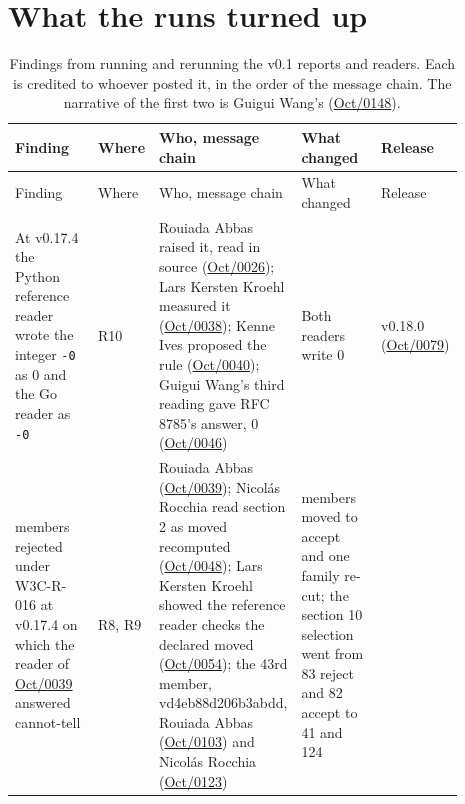 \providecommand{\aevmsg}[2]{\href{https://lists.w3.org/Archives/Public/public-agent-conformance/2026#1/#2.html}{#1/#2}}
\providecommand{\aevreadrelease}{0.32.1}

\section{What the runs turned up}
\label{sec:w3c-findings}

{\footnotesize
\begin{longtable}{@{}>{\raggedright\arraybackslash}p{0.24\linewidth}>{\raggedright\arraybackslash}p{0.07\linewidth}>{\raggedright\arraybackslash}p{0.27\linewidth}>{\raggedright\arraybackslash}p{0.22\linewidth}>{\raggedright\arraybackslash}p{0.09\linewidth}@{}}
\caption{Findings from running and rerunning the v0.1 reports and readers. Each is
credited to whoever posted it, in the order of the message chain. The narrative
of the first two is Guigui Wang's (\aevmsg{Oct}{0148}).}
\label{tab:w3c-findings}\\
\toprule
Finding & Where & Who, message chain & What changed & Release \\
\midrule
\endfirsthead
\toprule
Finding & Where & Who, message chain & What changed & Release \\
\midrule
\endhead
At v0.17.4 the Python reference reader wrote the integer \texttt{-0} as 0 and the Go reader as \texttt{-0} & R10 &
Rouiada Abbas raised it, read in source (\aevmsg{Oct}{0026}); Lars Kersten Kroehl measured it (\aevmsg{Oct}{0038});
Kenne Ives proposed the rule (\aevmsg{Oct}{0040}); Guigui Wang's third reading gave RFC 8785's answer, 0 (\aevmsg{Oct}{0046}) &
Both readers write 0 & v0.18.0 (\aevmsg{Oct}{0079}) \\
43 members rejected under W3C-R-016 at v0.17.4 on which the reader of \aevmsg{Oct}{0039} answered cannot-tell & R8, R9 &
Rouiada Abbas (\aevmsg{Oct}{0039}); Nicol\'as Rocchia read section 2 as moved recomputed (\aevmsg{Oct}{0048});
Lars Kersten Kroehl showed the reference reader checks the declared moved (\aevmsg{Oct}{0054});
the 43rd member, vd4eb88d206b3abdd, Rouiada Abbas (\aevmsg{Oct}{0103}) and Nicol\'as Rocchia (\aevmsg{Oct}{0123}) &
42 members moved to accept and one family re-cut; the section 10 selection went from 83 reject and 82 accept to 41 and 124 &

\end{longtable}}

